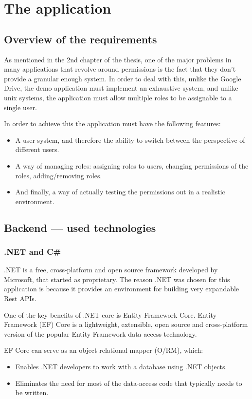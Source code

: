 \chapter{The application}
\section{Overview of the requirements}
As mentioned in the 2nd chapter of the thesis, one of the major problems in many applications that revolve around permissions is the fact that they don't provide a granular enough system. In order to deal with this, unlike the Google Drive, the demo application must implement an exhaustive system, and unlike unix systems, the application must allow multiple roles to be assignable to a single user.

In order to achieve this the application must have the following features:
\begin{itemize}
    \item A user system, and therefore the ability to switch between the perspective of different users.
    \item A way of managing roles: assigning roles to users, changing permissions of the roles, adding/removing roles.
    \item And finally, a way of actually testing the permissions out in a realistic environment.
\end{itemize}

\section{Backend --- used technologies}
\subsection{.NET and C\#}
.NET is a free, cross-platform and open source framework developed by Microsoft, that started as proprietary. The reason .NET was chosen for this application is because it provides an environment for building very expandable Rest APIs. 

One of the key benefits of .NET core is Entity Framework Core. Entity Framework (EF) Core is a lightweight, extensible, open source and cross-platform version of the popular Entity Framework data access technology.

EF Core can serve as an object-relational mapper (O/RM), which\cite{efCore}:

\begin{itemize}
 	\item Enables .NET developers to work with a database using .NET objects. \item Eliminates the need for most of the data-access code that typically needs to be written.
\end{itemize}

